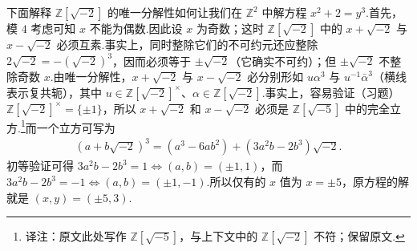 下面解释 $\mathbb Z[\sqrt{-2}]$ 的唯一分解性如何让我们在 $\mathbb Z^2$ 中解方程 $x^2+2=y^3$.首先，模 $4$ 考虑可知 $x$ 不能为偶数.因此设 $x$ 为奇数；这时 $\mathbb Z[\sqrt{-2}]$ 中的 $x+\sqrt{-2}$ 与 $x-\sqrt{-2}$ 必须互素.事实上，同时整除它们的不可约元还应整除 $2\sqrt{-2}=-(\sqrt{-2})^3$，因而必须等于 $\pm\sqrt{-2}$（它确实不可约）；但 $\pm\sqrt{-2}$ 不整除奇数 $x$.由唯一分解性，$x+\sqrt{-2}$ 与 $x-\sqrt{-2}$ 必分别形如 $u\alpha^3$ 与 $u^{-1}\bar\alpha^3$（横线表示复共轭），其中 $u\in\mathbb Z[\sqrt{-2}]^\times$、$\alpha\in\mathbb Z[\sqrt{-2}]$.事实上，容易验证（习题）$\mathbb Z[\sqrt{-2}]^\times=\{\pm1\}$，所以 $x+\sqrt{-2}$ 和 $x-\sqrt{-2}$ 必须是 $\mathbb Z[\sqrt{-5}]$ 中的完全立方.\footnote{译注：原文此处写作 $\mathbb Z[\sqrt{-5}]$，与上下文中的 $\mathbb Z[\sqrt{-2}]$ 不符；保留原文.}而一个立方可写为
\begin{align*}
(a+b\sqrt{-2})^3=(a^3-6ab^2)+(3a^2b-2b^3)\sqrt{-2}.
\end{align*}
初等验证可得 $3a^2b-2b^3=1\Longleftrightarrow(a,b)=(\pm1,1)$，而 $3a^2b-2b^3=-1\Longleftrightarrow(a,b)=(\pm1,-1)$.所以仅有的 $x$ 值为 $x=\pm5$，原方程的解就是 $(x,y)=(\pm5,3)$.
